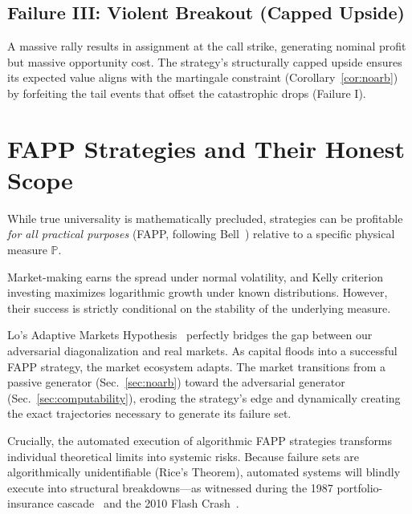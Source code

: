 \documentclass[aps,pra,reprint,superscriptaddress,amsmath,amssymb]{revtex4-2}
\theoremstyle{plain}
\theoremstyle{definition}
\theoremstyle{remark}
\begin{document}
\subsection{Failure III: Violent Breakout (Capped Upside)}

A massive rally results in assignment at the call strike, generating nominal profit but massive opportunity cost. The strategy's structurally capped upside ensures its expected value aligns with the martingale constraint (Corollary~\ref{cor:noarb}) by forfeiting the tail events that offset the catastrophic drops (Failure I).

\section{FAPP Strategies and Their Honest Scope}
\label{sec:fapp}

While true universality is mathematically precluded, strategies can be profitable \emph{for all practical purposes} (FAPP, following Bell~\cite{bell-a}) relative to a specific physical measure $\mathbb{P}$.

Market-making earns the spread under normal volatility, and Kelly criterion investing maximizes logarithmic growth under known distributions. However, their success is strictly conditional on the stability of the underlying measure.

Lo's Adaptive Markets Hypothesis~\cite{Lo2004} perfectly bridges the gap between our adversarial diagonalization and real markets. As capital floods into a successful FAPP strategy, the market ecosystem adapts. The market transitions from a passive generator (Sec.~\ref{sec:noarb}) toward the adversarial generator (Sec.~\ref{sec:computability}), eroding the strategy's edge and dynamically creating the exact trajectories necessary to generate its failure set.

Crucially, the automated execution of algorithmic FAPP strategies transforms individual theoretical limits into systemic risks. Because failure sets are algorithmically unidentifiable (Rice's Theorem), automated systems will blindly execute into structural breakdowns---as witnessed during the 1987 portfolio-insurance cascade~\cite{Brady1988} and the 2010 Flash Crash~\cite{Kirilenko2017}.

\end{document}
